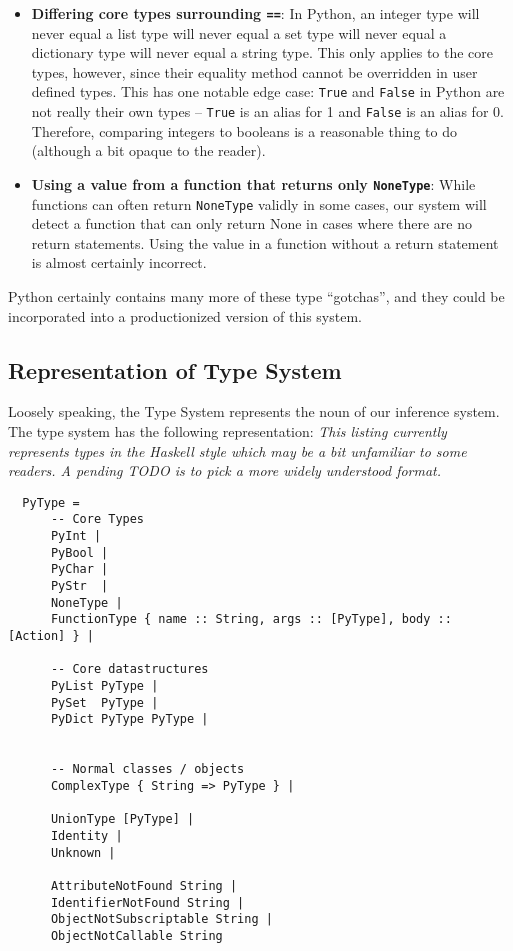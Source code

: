\documentclass{article}[12pt]
\begin{document}
\begin{itemize}
    \item \textbf{Differing core types surrounding \texttt{==}}: In Python, an integer type will never
          equal a list type will never equal a set type will never equal a dictionary type will
          never equal a string type. This only applies to the core types, however, since their
          equality method cannot be overridden in user defined types. This has one notable edge case: \texttt{True} and
          \texttt{False} in
          Python are not really their own types -- \texttt{True} is an alias for 1 and
          \texttt{False} is an alias for 0. Therefore, comparing integers to booleans is a
          reasonable thing to do (although a bit opaque to the reader).

      \item \textbf{Using a value from a function that returns only \texttt{NoneType}}: While functions can often
          return \texttt{NoneType} validly in some cases, our system will detect a function that can only
          return None in cases where there are no return statements. Using the value in a function
          without a return statement is almost certainly incorrect.
\end{itemize}

Python certainly contains many more of these type ``gotchas'', and they could be incorporated into a
productionized version of this system.

\subsection{Representation of Type System} 

Loosely speaking, the Type System represents the noun of our inference system. The type system has
the following representation:
\emph{This listing currently represents types in the Haskell style which may be a bit unfamiliar to some readers. A
pending TODO is to pick a more widely understood format.}
\begin{verbatim}
  PyType = 
      -- Core Types
      PyInt | 
      PyBool | 
      PyChar |
      PyStr  |
      NoneType |
      FunctionType { name :: String, args :: [PyType], body :: [Action] } | 

      -- Core datastructures
      PyList PyType | 
      PySet  PyType |
      PyDict PyType PyType | 


      -- Normal classes / objects
      ComplexType { String => PyType } | 

      UnionType [PyType] | 
      Identity |
      Unknown |

      AttributeNotFound String |
      IdentifierNotFound String |
      ObjectNotSubscriptable String |
      ObjectNotCallable String 
\end{verbatim}
\end{document}

